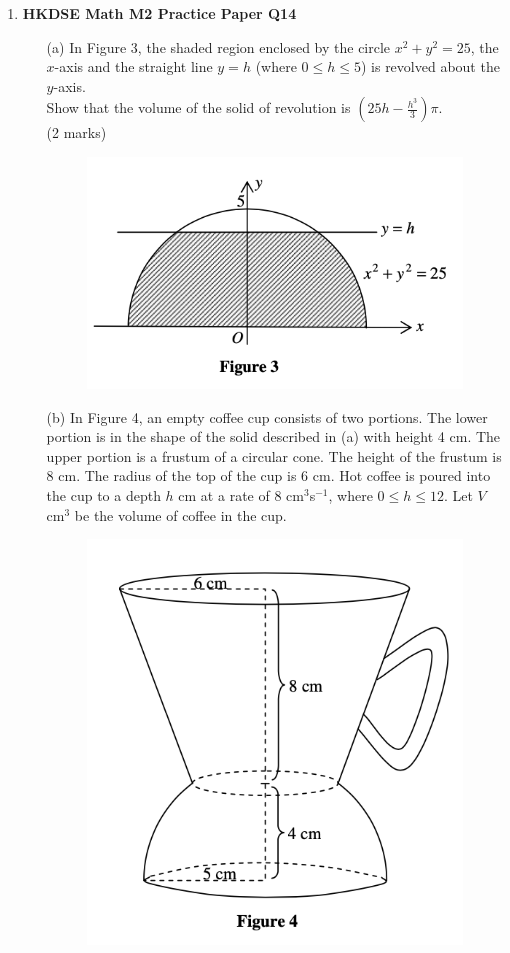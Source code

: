 \documentclass{report}
\begin{document}
\begin{enumerate}
	\newpage

	\item \textbf{HKDSE Math M2 Practice Paper Q14}
	\begin{enumerate}
		\item[(a)]In Figure 3, the shaded region enclosed by the circle $x^2 + y^2 = 25$, the $x$-axis and the straight line $y = h$ (where $0 \leq h \leq 5$) is revolved about the $y$-axis. \\
		Show that the volume of the solid of revolution is $\left(25h - \displaystyle\frac{h^3}{3}\right)\pi$. \\(2 marks)
		\begin{figure}[H]
			\centering
			\includegraphics[width = .5\linewidth]{PPFigure3}
		\end{figure}		
		\item[(b)]In Figure 4, an empty coffee cup consists of two portions. The lower portion is in the shape of the solid described in (a) with height 4 cm. The upper portion is a frustum of a circular cone. The height of the frustum is 8 cm. The radius of the top of the cup is 6 cm. Hot coffee is poured into the cup to a depth $h$ cm at a rate of 8 cm$^3$s$^{-1}$, where $0 \leq h \leq 12$. Let $V$ cm$^3$ be the volume of coffee in the cup. 
		\begin{figure}[H]
			\centering
			\includegraphics[width = .5\linewidth]{PPFigure4}
		\end{figure}
		\begin{enumerate}

\end{enumerate}
\end{enumerate}
\end{enumerate}
\end{document}
